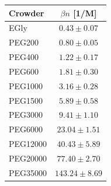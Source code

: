 \begin{tabular}{lc}
\toprule
Crowder & $\beta n$ [1/M] \\
\midrule
EGly & $0.43\pm0.07$ \\
PEG200 & $0.80\pm0.05$ \\
PEG400 & $1.22\pm0.17$ \\
PEG600 & $1.81\pm0.30$ \\
PEG1000 & $3.16\pm0.28$ \\
PEG1500 & $5.89\pm0.58$ \\
PEG3000 & $9.41\pm1.10$ \\
PEG6000 & $23.04\pm1.51$ \\
PEG12000 & $40.43\pm5.89$ \\
PEG20000 & $77.40\pm2.70$ \\
PEG35000 & $143.24\pm8.69$ \\
\bottomrule
\end{tabular}

